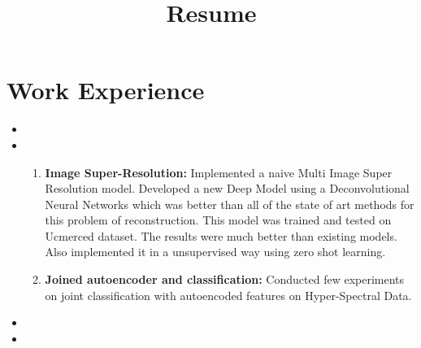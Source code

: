 \documentclass[10pt,a4paper,sans]{moderncv}        %
\title{Resume}                               %
\begin{document}
\makecvtitle


\section{Work Experience}

\vspace{2pt}

\begin{itemize}

	\item{}
	\item{} \begin{enumerate}
			 \item \textbf{Image Super-Resolution:}
				 Implemented a naive Multi Image Super Resolution model.
				 Developed a new Deep Model using a Deconvolutional Neural
				 Networks which was better than all of the state of art methods
				 for this problem of reconstruction. This model was trained and tested on Ucmerced dataset. The results were much
				 better than existing models. Also implemented it in a unsupervised way using zero shot learning.
			\vspace{3pt}
			 \item \textbf{Joined autoencoder and classification:}
					 Conducted few experiments on joint classification with
					 autoencoded features on Hyper-Spectral Data.%
		\end{enumerate}
	\vspace{3pt}	
\item{}
\item{}
\vspace{3pt}


\end{itemize}
\end{document}
